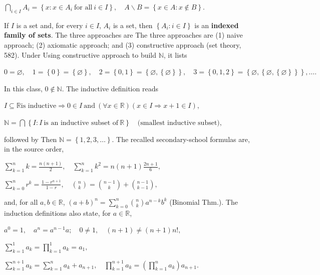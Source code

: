 \(\bigcap_{i \in I}A_{i} = \left\{ {x:x \in A_{i}\ \text{for all}\ i \in I} \right\},\quad A \smallsetminus B = \left\{ {x \in A:x \notin B} \right\}.\)

If \(I\) is a set and, for every \(i \in I\), \(A_{i}\) is a set, then \(\left\{ {A_{i}:i \in I} \right\}\) is an \textbf{indexed family of sets}. The three approaches are The three approaches are (1) naive approach; (2) axiomatic approach; and (3) constructive approach (set theory, 582). Under Using constructive approach to build \(\mathbb{N}\), it lists

\(0 = \varnothing,\quad 1 = \left\{ 0 \right\} = \left\{ \varnothing \right\},\quad 2 = \left\{ {0,1} \right\} = \left\{ {\varnothing,\left\{ \varnothing \right\}} \right\},\quad 3 = \left\{ {0,1,2} \right\} = \left\{ {\varnothing,\left\{ {\varnothing,\left\{ \varnothing \right\}} \right\}} \right\},\ldots.\)

In this class, \(0 \notin \mathbb{N}\). The inductive definition reads

\(I \subseteq \mathbb{R}\text{is inductive}\Rightarrow 0 \in I\ \text{and}\ \left( {\forall x \in \mathbb{R}} \right)\left( {x \in I\Rightarrow x + 1 \in I} \right),\)

\(\mathbb{N} = \bigcap\left\{ {I:I\ \text{is an inductive subset of}\ \mathbb{R}} \right\}\quad\text{(smallest inductive subset)},\)

followed by Then \(\mathbb{N} = \left\{ {1,2,3,\ldots} \right\}\). The recalled secondary-school formulas are, in the source order,

\(\sum_{k = 1}^{n}k = \frac{n\left( {n + 1} \right)}{2},\quad\sum_{k = 1}^{n}k^{2} = n\left( {n + 1} \right)\frac{2n + 1}{6},\)

\(\sum_{k = 0}^{n}r^{k} = \frac{1 - r^{n + 1}}{1 - r},\quad\binom{n}{k} = \binom{n - 1}{k} + \binom{n - 1}{k - 1},\)

and, for all \(a,b \in \mathbb{R}\), \(\left( {a + b} \right)^{n} = \sum_{k = 0}^{n}\binom{n}{k}a^{n - k}b^{k}\) (Binomial Thm.). The induction definitions also state, for \(a \in \mathbb{R}\),

\(a^{0} = 1,\quad a^{n} = a^{n - 1}a;\quad 0 \neq 1,\quad\left( {n + 1} \right) \neq \left( {n + 1} \right)n!,\)

\(\sum_{k = 1}^{1}a_{k} = \prod_{k = 1}^{1}a_{k} = a_{1},\)

\(\sum_{k = 1}^{n + 1}a_{k} = \sum_{k = 1}^{n}a_{k} + a_{n + 1},\quad\prod_{k = 1}^{n + 1}a_{k} = \left( {\prod_{k = 1}^{n}a_{k}} \right)a_{n + 1}.\)

